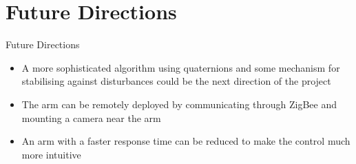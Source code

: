 \documentclass{beamer}
\begin{document}
\section{Future Directions}
\begin{frame}{Future Directions}
\begin{itemize}
\item A more sophisticated algorithm using quaternions and some mechanism for stabilising against disturbances could be the next direction of the project
\item The arm can be remotely deployed by communicating through ZigBee and mounting a camera near the arm
\item An arm with a faster response time can be reduced to make the control much more intuitive
\end{itemize}
\end{frame}
\end{document}
